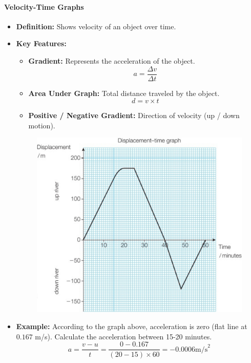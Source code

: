 \paragraph{Velocity-Time Graphs}
\begin{itemize}
    \item \textbf{Definition:} Shows velocity of an object over time.
    \item \textbf{Key Features:}
    \begin{itemize}
        \item \textbf{Gradient:} Represents the acceleration of the object.
        \begin{equation}
            a = \frac{\Delta v}{\Delta t}
        \end{equation}
        \item \textbf{Area Under Graph:} Total distance traveled by the object.
        \begin{equation}
            d = v \times t
        \end{equation}
        \item \textbf{Positive / Negative Gradient:} Direction of velocity (up / down motion).
    \end{itemize}
    \begin{figure}[H]
        \centering
        \includegraphics[scale=0.15]{Physics/1A/Images/1A-2-2.png}
    \end{figure}
    \item \textbf{Example:} According to the graph above, acceleration is zero (flat line at $0.167$ m/s). Calculate the
    acceleration between 15-20 minutes.
    \begin{equation}
        a = \frac{v - u}{t} = \frac{0 - 0.167}{\left(20 - 15\right) \times 60} = -0.0006 \text{m/s}^2
    \end{equation}
\end{itemize}

